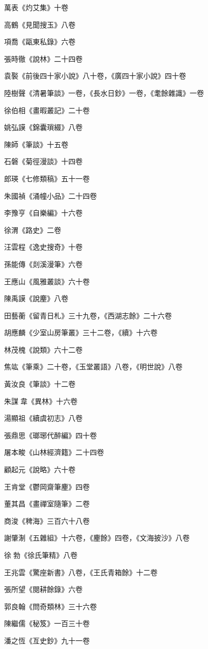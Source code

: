 萬表《灼艾集》十卷

高鶴《見聞搜玉》八卷

項喬《甌東私錄》六卷

張時徹《說林》二十四卷

袁褧《前後四十家小說》八十卷，《廣四十家小說》四十卷

陸樹聲《清暑筆談》一卷，《長水日鈔》一卷，《耄餘雜識》一卷

徐伯相《畫暇叢記》二十卷

姚弘謨《錦囊瑣綴》八卷

陳師《筆談》十五卷

石磐《菊徑漫談》十四卷

郎瑛《七修類稿》五十一卷

朱國禎《涌幢小品》二十四卷

李豫亨《自樂編》十六卷

徐渭《路史》二卷

汪雲程《逸史搜奇》十卷

孫能傳《剡溪漫筆》六卷

王應山《風雅叢談》六十卷

陳禹謨《說麈》八卷

田藝蘅《留青日札》三十九卷，《西湖志餘》二十六卷

胡應麟《少室山房筆叢》三十二卷，《續》十六卷

林茂槐《說類》六十二卷

焦竑《筆乘》二十卷，《玉堂叢語》八卷，《明世說》八卷

黃汝良《筆談》十二卷

朱謀韋《異林》十六卷

湯顯祖《續虞初志》八卷

張鼎思《瑯琊代醉編》四十卷

屠本畯《山林經濟籍》二十四卷

顧起元《說略》六十卷

王肯堂《鬱岡齋筆麈》四卷

董其昌《畫禪室隨筆》二卷

商浚《稗海》三百六十八卷

謝肇淛《五雜組》十六卷，《麈餘》四卷，《文海披沙》八卷

徐勃《徐氏筆精》八卷

王兆雲《驚座新書》八卷，《王氏青箱餘》十二卷

張所望《閱耕餘錄》六卷

郭良翰《問奇類林》三十六卷

陳繼儒《秘笈》一百三十卷

潘之恆《亙史鈔》九十一卷

